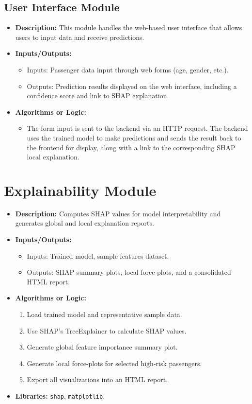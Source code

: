 \documentclass[15pt]{article}
\begin{document}
\subsection{User Interface Module}

\begin{itemize}
    \item \textbf{Description:} This module handles the web-based user interface that allows users to input data and receive predictions.
    \item \textbf{Inputs/Outputs:} 
    \begin{itemize}
        \item Inputs: Passenger data input through web forms (age, gender, etc.).
        \item Outputs: Prediction results displayed on the web interface, including a confidence score and link to SHAP explanation.
    \end{itemize}
    \item \textbf{Algorithms or Logic:} 
    \begin{itemize}
        \item The form input is sent to the backend via an HTTP request. The backend uses the trained model to make predictions and sends the result back to the frontend for display, along with a link to the corresponding SHAP local explanation.
    \end{itemize}
\end{itemize}

\section{Explainability Module}

\begin{itemize}
    \item \textbf{Description:} Computes SHAP values for model interpretability and generates global and local explanation reports.
    \item \textbf{Inputs/Outputs:}
    \begin{itemize}
        \item Inputs: Trained model, sample features dataset.
        \item Outputs: SHAP summary plots, local force-plots, and a consolidated HTML report.
    \end{itemize}
    \item \textbf{Algorithms or Logic:}
    \begin{enumerate}
        \item Load trained model and representative sample data.
        \item Use SHAP’s TreeExplainer to calculate SHAP values.
        \item Generate global feature importance summary plot.
        \item Generate local force-plots for selected high-risk passengers.
        \item Export all visualizations into an HTML report.
    \end{enumerate}
    \item \textbf{Libraries:} \texttt{shap}, \texttt{matplotlib}.
\end{itemize}
\end{document}
